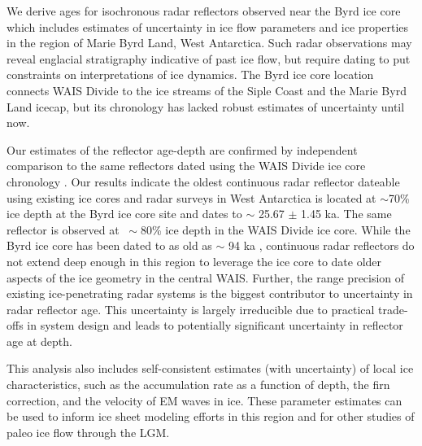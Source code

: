 

We derive ages for isochronous radar reflectors observed near the Byrd ice core which includes estimates of uncertainty in ice flow parameters and ice properties in the region of Marie Byrd Land, West Antarctica. Such radar observations may reveal englacial stratigraphy indicative of past ice flow, but require dating to put constraints on interpretations of ice dynamics. The Byrd ice core location connects WAIS Divide to the ice streams of the Siple Coast and the Marie Byrd Land icecap, but its chronology has lacked robust estimates of uncertainty until now. 

Our estimates of the reflector age-depth are confirmed by independent comparison to the same reflectors dated using the WAIS Divide ice core chronology \citep{buizert2015}. Our results indicate the oldest continuous radar reflector dateable using existing ice cores and radar surveys in West Antarctica is located at $\sim$70\% ice depth at the Byrd ice core site and dates to $\sim$ 25.67 $\pm$ 1.45 ka. The same reflector is observed at $~\sim$80\% ice depth in the WAIS Divide ice core. While the Byrd ice core has been dated to as old as $\sim$ 94 ka \citep{blunier2001}, continuous radar reflectors do not extend deep enough in this region to leverage the ice core to date older aspects of the ice geometry in the central WAIS. Further, the range precision of existing ice-penetrating radar systems is the biggest contributor to uncertainty in radar reflector age. This uncertainty is largely irreducible due to practical trade-offs in system design and leads to potentially significant uncertainty in reflector age at depth. 

This analysis also includes self-consistent estimates (with uncertainty) of local ice characteristics, such as the accumulation rate as a function of depth, the firn correction, and the velocity of EM waves in ice. These parameter estimates can be used to inform ice sheet modeling efforts in this region and for other studies of paleo ice flow through the LGM. 






